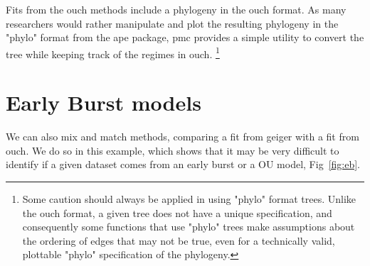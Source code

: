 \documentclass{elsarticle}
\makeatletter
\newenvironment{kframe}{%
 \def\FrameCommand##1{\hskip\@totalleftmargin \hskip-\fboxsep
 \colorbox{shadecolor}{##1}\hskip-\fboxsep
     \hskip-\linewidth \hskip-\@totalleftmargin \hskip\columnwidth}%
 \MakeFramed {\advance\hsize-\width
   \@totalleftmargin\z@ \linewidth\hsize
   \@setminipage}}%
 {\par\unskip\endMakeFramed}
\newenvironment{knitrout}{}{} %
\makeatother
\begin{document}
\begin{figure}
\begin{center}
\begin{knitrout}
\begin{kframe}
{}

\end{kframe}
\end{knitrout}

\end{center}
\end{figure}


Fits from the ouch methods include a phylogeny in the ouch format.  As many researchers would rather manipulate and plot the resulting phylogeny in the "phylo" format from the ape package, pmc provides a simple utility to convert the tree while keeping track of the regimes in ouch.  \footnote{Some caution should always be applied in using "phylo" format trees.  Unlike the ouch format, a given tree does not have a unique specification, and consequently some functions that use "phylo" trees make assumptions about the ordering of edges that may not be true, even for a technically valid, plottable "phylo" specification of the phylogeny.}
%

\section{Early Burst models}
We can also mix and match methods, comparing a fit from geiger with a fit from ouch.  We do so in this example, which shows that it may be very difficult to identify if a given dataset comes from an early burst or a OU model, Fig~\ref{fig:eb}.
\end{document}
